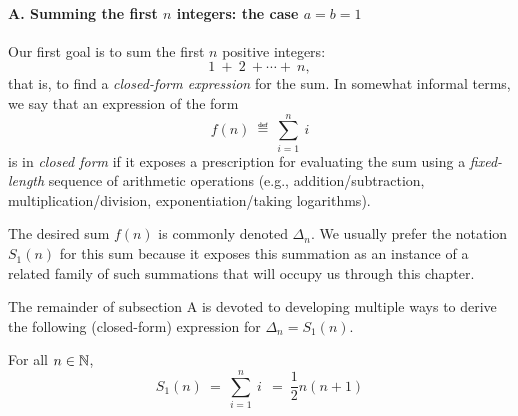 \paragraph{\small\sf A. Summing the first $n$ integers: the case $a=b=1$}

Our first goal is to sum the first $n$ positive integers:
\[ 1 \ + \ 2 \ + \cdots + \ n , \]
that is, to find a {\it closed-form expression} 
for the sum.  In somewhat informal terms, we say that an expression of
the form
\[ f(n) \ \eqdef \ \sum_{i=1}^n \ i \]
is in {\it closed form} if it exposes a prescription for evaluating
the sum using a {\em fixed-length} sequence of arithmetic operations
(e.g., addition/subtraction, multiplication/division,
exponentiation/taking logarithms).

The desired sum $f(n)$ is commonly denoted $\Delta_n$.
We usually prefer the notation $S_1(n)$ for this sum because it
exposes this summation as an instance of a related family of such
summations that will occupy us through this chapter.

The remainder of subsection A is devoted to developing multiple ways
to derive the following (closed-form) expression for $\Delta_n =
S_1(n)$.

\begin{prop}
\label{thm:sum-first-integers-Gauss}
For all $n \in \mathbb{N}$,
\begin{equation}
\label{eq:sum-1-to-n}
S_1(n) \ = \ \sum_{i=1}^n \ i \
  \ = \  \frac{1}{2} n (n+1) 
\end{equation}
\end{prop}


